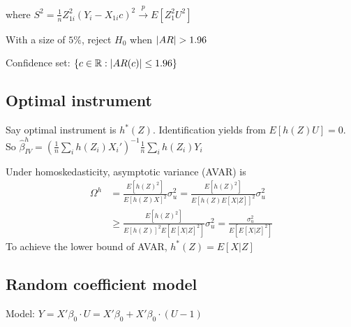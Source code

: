 \documentclass[10pt,landscape]{article}
\begin{document}
\begin{multicols}{3}
\begin{adjustwidth}{.3cm}{0cm}
where $S^2 = \frac{1}{n} Z_{1i}^2 (Y_i - X_{1i}c)^2 \xrightarrow{p} E[Z_1^2 U^2]$

With a size of $5\%$, reject $H_0$ when $\left| AR \right| > 1.96$

Confidence set: $\{ c \in \mathbb R : \left| AR(c) \right| \leq 1.96 \}$
\end{adjustwidth}

\subsection{Optimal instrument}

Say optimal instrument is $h^*(Z)$. Identification yields from $E[h(Z) U] = 0$. So 
$
  \hat{\beta}^h_{IV} = (\frac{1}{n} \sum_{i} h(Z_i)X_i' )^{-1} \frac{1}{n}\sum_{i} h(Z_i) Y_i
$

Under homoskedasticity, asymptotic variance (AVAR) is 
\begin{align*}
  \Omega^h &= \frac{E[h(Z)^2]}{E[h(Z)X]^2} \sigma_u^2 = \frac{E[h(Z)^2]}{E[h(Z) E[X|Z]]^2} \sigma_u^2 \\
  &\geq \frac{E[h(Z)^2]}{E[h(Z)]^2 E[E[X|Z]^2]} \sigma_u^2 = \frac{\sigma_u^2}{E[E[X|Z]^2]}
\end{align*}
To achieve the lower bound of AVAR, 
$
  h^*(Z) = E[X|Z]
$

\subsection{Random coefficient model}

Model: $Y = X'\beta_0 \cdot U = X'\beta_0 + X'\beta_0 \cdot (U - 1)$


\end{multicols}
\end{document}
